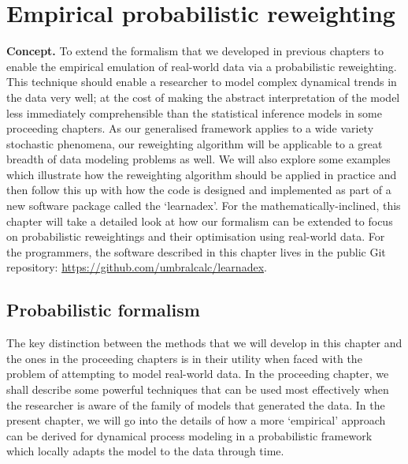 \chapter{\sffamily Empirical probabilistic reweighting}

{\bfseries\sffamily Concept.} To extend the formalism that we developed in previous chapters to enable the empirical emulation of real-world data via a probabilistic reweighting. This technique should enable a researcher to model complex dynamical trends in the data very well; at the cost of making the abstract interpretation of the model less immediately comprehensible than the statistical inference models in some proceeding chapters. As our generalised framework applies to a wide variety stochastic phenomena, our reweighting algorithm will be applicable to a great breadth of data modeling problems as well. We will also explore some examples which illustrate how the reweighting algorithm should be applied in practice and then follow this up with how the code is designed and implemented as part of a new software package called the `learnadex'. For the mathematically-inclined, this chapter will take a detailed look at how our formalism can be extended to focus on probabilistic reweightings and their optimisation using real-world data. For the programmers, the software described in this chapter lives in the public Git repository: \href{https://github.com/umbralcalc/learnadex}{https://github.com/umbralcalc/learnadex}.

\section{\sffamily Probabilistic formalism}

The key distinction between the methods that we will develop in this chapter and the ones in the proceeding chapters is in their utility when faced with the problem of attempting to model real-world data. In the proceeding chapter, we shall describe some powerful techniques that can be used most effectively when the researcher is aware of the family of models that generated the data. In the present chapter, we will go into the details of how a more `empirical' approach can be derived for dynamical process modeling in a probabilistic framework which locally adapts the model to the data through time. 

